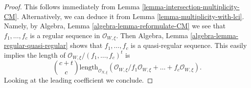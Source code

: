 \documentclass[10pt,a4paper]{amsart}
\theoremstyle{plain}
\theoremstyle{definition}
\theoremstyle{remark}
\numberwithin{equation}{subsection}
\begin{document}
\begin{proof}
This follows immediately from Lemma \ref{lemma-intersection-multiplicity-CM}.
Alternatively, we can deduce it from Lemma \ref{lemma-multiplicity-with-lci}.
Namely, by Algebra, Lemma \ref{algebra-lemma-reformulate-CM}
we see that $f_1, \ldots, f_c$ is a regular sequence in
$\mathcal{O}_{W, \xi}$. Then
Algebra, Lemma \ref{algebra-lemma-regular-quasi-regular} shows that
$f_1, \ldots, f_c$ is a quasi-regular sequence.
This easily implies the length of
$\mathcal{O}_{W, \xi}/(f_1, \ldots, f_c)^t$ is
$$
{c + t \choose c}
\text{length}_{\mathcal{O}_{X, \xi}} (\mathcal{O}_{W, \xi}/
f_1\mathcal{O}_{W, \xi} + \ldots + f_c\mathcal{O}_{W, \xi}).
$$
Looking at the leading coefficient we conclude.
\end{proof}
\end{document}
